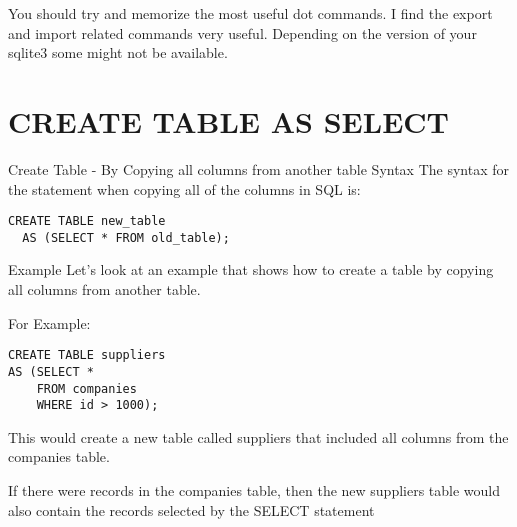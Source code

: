 You should try and memorize the most useful dot commands. I find the export and import related commands very useful. Depending on the version of your sqlite3 some might not be available.



\section{CREATE TABLE AS SELECT}

Create Table - By Copying all columns from another table
Syntax
The syntax for the  statement when copying all of the columns in SQL is:

\begin{verbatim}
CREATE TABLE new_table
  AS (SELECT * FROM old_table);
\end{verbatim}  
  
Example
Let's look at an example that shows how to create a table by copying all columns from another table.

For Example:

\begin{verbatim}
CREATE TABLE suppliers
AS (SELECT *
    FROM companies
    WHERE id > 1000);
\end{verbatim}
    
This would create a new table called suppliers that included all columns from the companies table.

If there were records in the companies table, then the new suppliers table would also contain the records selected by the SELECT statement

